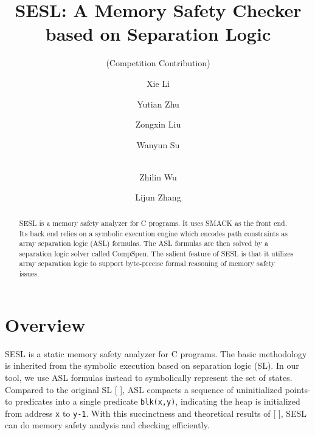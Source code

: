 \documentclass[runningheads]{llncs}
\newcommand{\lx}[1]{\color{teal}{LX: #1 :XL} \color{black}}
\begin{document}
%
\title{\textsc{SESL}: A Memory Safety Checker based on Separation Logic }
\subtitle{(Competition Contribution)}
%
%
\author{Xie Li \and
Yutian Zhu \and
Zongxin Liu \and
Wanyun Su\and
\\
Zhilin Wu\and
Lijun Zhang}
%
%


%
\maketitle              %
%
\begin{abstract}

SESL is a memory safety analyzer for C programs. It uses SMACK as the front end. Its back end relies on a symbolic execution engine which encodes path constraints as array separation logic (ASL) formulas. The ASL formulas are then solved by a separation logic solver called CompSpen. The salient feature of SESL is that it utilizes array separation logic to support byte-precise formal reasoning of memory safety issues.

\end{abstract}
%
%
%
\section{Overview}
\textsc{SESL} is a static memory safety analyzer for C programs. 
The basic methodology is inherited from the symbolic execution based on separation logic (SL)\cite{DBLP:conf/aplas/BerdineCO05}. In our tool, we use ASL formulas instead to symbolically represent the set of states. 
Compared to the original SL \cite{DBLP:conf/lics/Reynolds02} [\lx{add later variants}], ASL compacts a sequence of uninitialized points-to predicates into a single predicate \texttt{blk(x,y)}, indicating the heap is initialized from address \texttt{x} to \texttt{y-1}. With this succinctness and theoretical results of [\lx{ASL solving paper}], \textsc{SESL} can do memory safety analysis and checking  efficiently.
\end{document}
